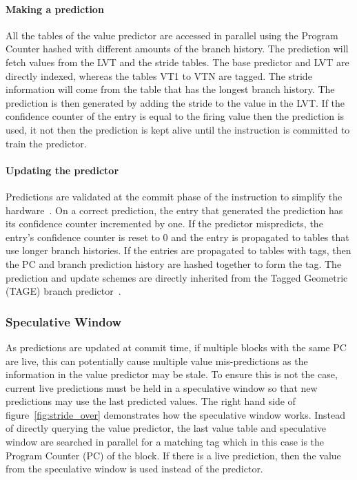 \paragraph*{Making a prediction}
All the tables of the value predictor are accessed in parallel using the Program Counter hashed with different amounts of the branch history.
The prediction will fetch values from the LVT and the stride tables.
The base predictor and LVT are directly indexed, whereas the tables VT1 to VTN are tagged.
The stride information will come from the table that has the longest branch history.
The prediction is then generated by adding the stride to the value in the LVT.
If the confidence counter of the entry is equal to the firing value then the prediction is used, it not then the prediction is kept alive until the instruction is committed to train the predictor.

\paragraph*{Updating the predictor}
Predictions are validated at the commit phase of the instruction to simplify the hardware~\cite{peraisVTAGE2014}.
On a correct prediction, the entry that generated the prediction has its confidence counter incremented by one.
If the predictor mispredicts, the entry's confidence counter is reset to 0 and the entry is propagated to tables that use longer branch histories.
If the entries are propagated to tables with tags, then the PC and branch prediction history are hashed together to form the tag.
The prediction and update schemes are directly inherited from the Tagged Geometric (TAGE) branch predictor~\cite{SeznecITTAGE}.

\subsubsection{Speculative Window}
As predictions are updated at commit time, if multiple blocks with the same PC are live, this can potentially cause multiple value mis-predictions as the information in the value predictor may be stale.
To ensure this is not the case, current live predictions must be held in a speculative window so that new predictions may use the last predicted values.
The right hand side of figure~\ref{fig:stride_over} demonstrates how the speculative window works. 
Instead of directly querying the value predictor, the last value table and speculative window are searched in parallel for a matching tag which in this case is the Program Counter (PC) of the block.
If there is a live prediction, then the value from the speculative window is used instead of the predictor.
\vspace{-1em}
